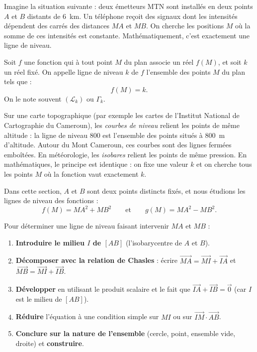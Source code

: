 \documentclass[11pt]{article}
\newcommand{\cle}[1]{{\popxbold\color{popdark}#1}}
\newcounter{popsec}
\newcounter{popsub}
\newcommand{\courssub}[1]{%
  \stepcounter{popsub}%
  \par\vspace{9pt}\noindent{\popxbold\fontsize{11.5}{13}\selectfont\color{popink}{\color{poporange}\thepopsec.\thepopsub}\hspace{6pt}#1}\par\nopagebreak\vspace{4pt}
}
\begin{document}
Imagine la situation suivante : deux émetteurs MTN sont installés en deux points $A$ et $B$ distants de \SI{6}{km}. Un téléphone reçoit des signaux dont les intensités dépendent des carrés des distances $MA$ et $MB$. On cherche les positions $M$ où la somme de ces intensités est constante. Mathématiquement, c'est exactement une \cle{ligne de niveau}.

\courssub{Notion de ligne de niveau}

\begin{definition}
Soit $f$ une fonction qui à tout point $M$ du plan associe un réel $f(M)$, et soit $k$ un réel fixé. On appelle \cle{ligne de niveau} $k$ de $f$ l'ensemble des points $M$ du plan tels que :
\[ f(M) = k. \]
On le note souvent $(\mathcal{L}_k)$ ou $\Gamma_k$.
\end{definition}

\begin{savaistu}
Sur une carte topographique (par exemple les cartes de l'Institut National de Cartographie du Cameroun), les \emph{courbes de niveau} relient les points de même altitude : la ligne de niveau $800$ est l'ensemble des points situés à \SI{800}{m} d'altitude. Autour du Mont Cameroun, ces courbes sont des lignes fermées emboîtées. En météorologie, les \emph{isobares} relient les points de même pression. En mathématiques, le principe est identique : on fixe une valeur $k$ et on cherche tous les points $M$ où la fonction vaut exactement $k$.
\end{savaistu}

Dans cette section, $A$ et $B$ sont deux points distincts fixés, et nous étudions les lignes de niveau des fonctions :
\[ f(M) = MA^2 + MB^2 \qquad \text{et} \qquad g(M) = MA^2 - MB^2. \]

\begin{methode}
Pour déterminer une ligne de niveau faisant intervenir $MA$ et $MB$ :
\begin{enumerate}
\item \textbf{Introduire le milieu $I$ de $[AB]$} (l'isobarycentre de $A$ et $B$).
\item \textbf{Décomposer avec la relation de Chasles} : écrire $\overrightarrow{MA} = \overrightarrow{MI} + \overrightarrow{IA}$ et $\overrightarrow{MB} = \overrightarrow{MI} + \overrightarrow{IB}$.
\item \textbf{Développer} en utilisant le produit scalaire et le fait que $\overrightarrow{IA} + \overrightarrow{IB} = \vec{0}$ (car $I$ est le milieu de $[AB]$).
\item \textbf{Réduire} l'équation à une condition simple sur $MI$ ou sur $\overrightarrow{IM} \cdot \overrightarrow{AB}$.
\item \textbf{Conclure sur la nature de l'ensemble} (cercle, point, ensemble vide, droite) et \textbf{construire}.
\end{enumerate}
\end{methode}
\end{document}
